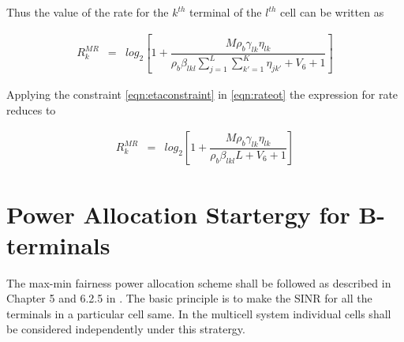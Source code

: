 \documentclass[10pt, a4paper, twoside,fleqn]{article}
\begin{document}
Thus the value of the rate for the $k^{th}$ terminal of the $l^{th}$ cell can be written as

\begin{eqnarray}\label{eqn:rateot}
	R_k^{MR} &=& log_2\left[1+ \dfrac{M\rho_b\gamma_{lk}\eta_{lk}}{\rho_b\beta_{lkl}\sum\limits_{j=1}^{L} \sum\limits_{k' = 1}^{K}\eta_{jk'}
				+V_6
				+1}\right]
\end{eqnarray}

Applying the constraint \ref{eqn:etaconstraint} in \ref{eqn:rateot} the expression for rate reduces to

\begin{eqnarray}\label{eqn:finalratebt}
R_k^{MR} &=& log_2\left[1+ \dfrac{M\rho_b\gamma_{lk}\eta_{lk}}{\rho_b\beta_{lkl}L
    +V_6
    +1}\right]
\end{eqnarray}


\section{Power Allocation Startergy for B-terminals}
  The max-min fairness power allocation scheme shall be followed as described in Chapter 5 and 6.2.5 in \cite{bib:MassiveMimoBook}. The basic principle is to make the SINR for all the terminals in a particular cell same. In the multicell system individual cells shall be considered independently under this stratergy. 
\end{document}
